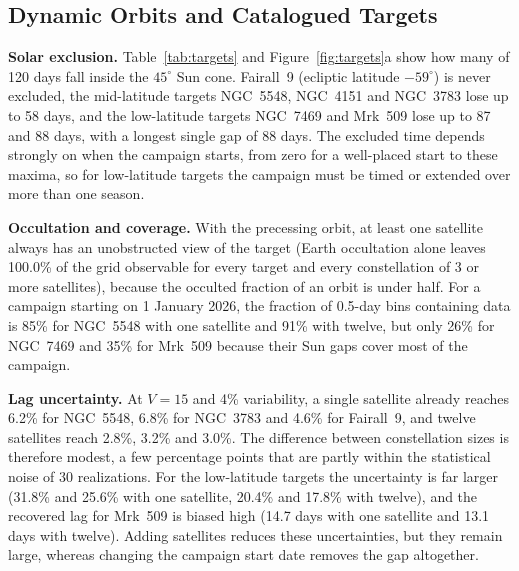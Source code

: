 \documentclass[11pt]{article}
\begin{document}
\subsection{Dynamic Orbits and Catalogued Targets}
\label{sec:targets}

\textbf{Solar exclusion.} Table~\ref{tab:targets} and Figure~\ref{fig:targets}a show how many of 120 days fall inside the $45^{\circ}$ Sun cone. Fairall~9 (ecliptic latitude $-59^{\circ}$) is never excluded, the mid-latitude targets NGC~5548, NGC~4151 and NGC~3783 lose up to 58 days, and the low-latitude targets NGC~7469 and Mrk~509 lose up to 87 and 88 days, with a longest single gap of 88 days. The excluded time depends strongly on when the campaign starts, from zero for a well-placed start to these maxima, so for low-latitude targets the campaign must be timed or extended over more than one season.

\textbf{Occultation and coverage.} With the precessing orbit, at least one satellite always has an unobstructed view of the target (Earth occultation alone leaves 100.0\% of the grid observable for every target and every constellation of 3 or more satellites), because the occulted fraction of an orbit is under half. For a campaign starting on 1 January 2026, the fraction of 0.5-day bins containing data is 85\% for NGC~5548 with one satellite and 91\% with twelve, but only 26\% for NGC~7469 and 35\% for Mrk~509 because their Sun gaps cover most of the campaign.

\textbf{Lag uncertainty.} At $V = 15$ and 4\% variability, a single satellite already reaches 6.2\% for NGC~5548, 6.8\% for NGC~3783 and 4.6\% for Fairall~9, and twelve satellites reach 2.8\%, 3.2\% and 3.0\%. The difference between constellation sizes is therefore modest, a few percentage points that are partly within the statistical noise of 30 realizations. For the low-latitude targets the uncertainty is far larger (31.8\% and 25.6\% with one satellite, 20.4\% and 17.8\% with twelve), and the recovered lag for Mrk~509 is biased high (14.7 days with one satellite and 13.1 days with twelve). Adding satellites reduces these uncertainties, but they remain large, whereas changing the campaign start date removes the gap altogether.
\end{document}
